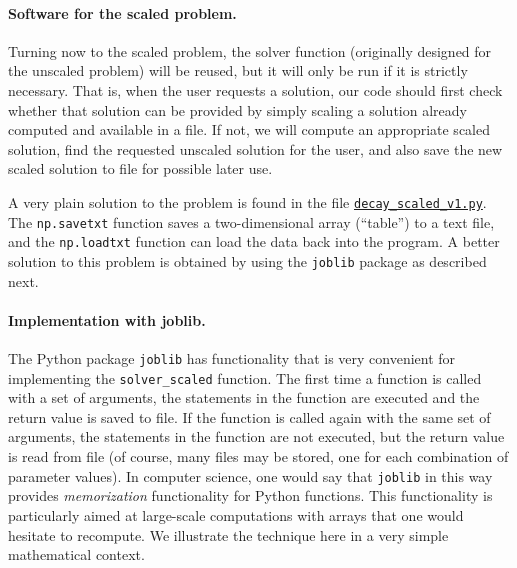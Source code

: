 \documentclass[graybox,envcountchap,sectrefs,final]{svmonodo}
\begin{document}
\paragraph{Software for the scaled problem.}
Turning now to the scaled problem, the solver function (originally
designed for the unscaled problem) will be reused, but it will only
be run if it is strictly necessary. That is, when the user requests
a solution, our code should first check whether that solution can be provided
by simply scaling a solution already computed and available in a file.
If not, we will compute an appropriate scaled solution, find the
requested unscaled solution for the user, and also save the new scaled
solution to file for possible later use.


A very plain solution to the problem is found in the file
\href{{http://tinyurl.com/o8pb3yy/decay_scaled_v1.py}}{\nolinkurl{decay_scaled_v1.py}}.
The \texttt{np.savetxt} function saves a two-dimensional array (``table'') to
a text file, and the \texttt{np.loadtxt} function can load the data back
into the program. A better solution to this problem is obtained
by using the \texttt{joblib} package as described next.


\paragraph{Implementation with joblib.}
The Python package \texttt{joblib} has functionality that is very convenient
for implementing the \Verb!solver_scaled! function. The first time a
function is called with a set of arguments, the statements in the
function are executed and the return value is saved to file. If the
function is called again with the same set of arguments, the
statements in the function are not executed, but the return value is
read from file (of course, many files may be stored, one for each
combination of parameter values).  In computer science, one would say
that \texttt{joblib} in this way provides \emph{memorization} functionality for
Python functions.  This functionality is particularly aimed at
large-scale computations with arrays that one would hesitate to
recompute. We illustrate the technique here in a very simple
mathematical context.
\end{document}
